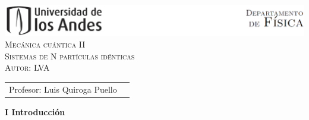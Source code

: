 \documentclass[letterpaper,10pt,onecolumn]{article}
\begin{document}
\begin{center}
\includegraphics[width=490pt]{logo.png}\\[0.5cm]
\textsc{\LARGE Mec\'anica cu\'antica II}\\[0.5cm]
\textsc{\LARGE Sistemas de N part\'iculas id\'enticas}\\[0.5cm]
\textsc{\large Autor: LVA}\\[0.5cm]
\end{center}

\begin{center}
\begin{tabular}{l r}
\large
Profesor: Luis Quiroga Puello%
\normalsize
\end{tabular}
\end{center}


\textbf{\Large I Introducci\'on}
\end{document}
